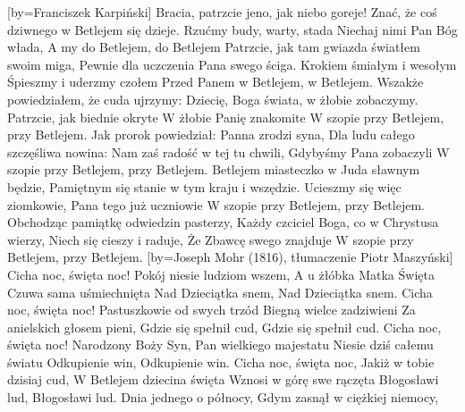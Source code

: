 [by={Franciszek Karpiński}]
\beginverse
    Bracia, patrzcie jeno, jak niebo goreje!
    Znać, że coś dziwnego w Betlejem się dzieje.
    Rzućmy budy, warty, stada
    Niechaj nimi Pan Bóg włada,
    A my do Betlejem, do Betlejem 
\endverse
\beginverse
    Patrzcie, jak tam gwiazda światłem swoim miga,
    Pewnie dla uczczenia Pana swego ściga.
    Krokiem śmiałym i wesołym
    Śpieszmy i uderzmy czołem
    Przed Panem w Betlejem, w Betlejem.
\endverse
\beginverse
    Wszakże powiedziałem, że cuda ujrzymy:
    Dziecię, Boga świata, w żłobie zobaczymy.
    Patrzcie, jak biednie okryte
    W żłobie Panię znakomite
    W szopie przy Betlejem, przy Betlejem.
\endverse
\beginverse
    Jak prorok powiedział: Panna zrodzi syna,
    Dla ludu całego szczęśliwa nowina:
    Nam zaś radość w tej tu chwili,
    Gdybyśmy Pana zobaczyli
    W szopie przy Betlejem, przy Betlejem.
\endverse
\beginverse
    Betlejem miasteczko w Juda sławnym będzie,
    Pamiętnym się stanie w tym kraju i wszędzie.
    Ucieszmy się więc ziomkowie,
    Pana tego już uczniowie
    W szopie przy Betlejem, przy Betlejem.
\endverse
\beginverse
    Obchodząc pamiątkę odwiedzin pasterzy,
    Każdy czciciel Boga, co w Chrystusa wierzy,
    Niech się cieszy i raduje,
    Że Zbawcę swego znajduje
    W szopie przy Betlejem, przy Betlejem.
\endverse
\endsong
[by={Joseph Mohr (1816), tłumaczenie Piotr Maszyński}]
\beginverse
    Cicha noc, święta noc!
    Pokój niesie ludziom wszem,
    A u żłóbka Matka Święta
    Czuwa sama uśmiechnięta
    Nad Dzieciątka snem,
    Nad Dzieciątka snem.
\endverse
\beginverse
    Cicha noc, święta noc!
    Pastuszkowie od swych trzód
    Biegną wielce zadziwieni
    Za anielskich głosem pieni,
    Gdzie się spełnił cud,
    Gdzie się spełnił cud.
\endverse
\beginverse
    Cicha noc, święta noc!
    Narodzony Boży Syn,
    Pan wielkiego majestatu
    Niesie dziś całemu światu
    Odkupienie win,
    Odkupienie win.
\endverse
\beginverse
    Cicha noc, święta noc,
    Jakiż w tobie dzisiaj cud,
    W Betlejem dziecina święta
    Wznosi w górę swe rączęta
    Błogosławi lud,
    Błogosławi lud.
\endverse
\endsong
\beginverse
    Dnia jednego o północy,
    Gdym zasnął w ciężkiej niemocy,
